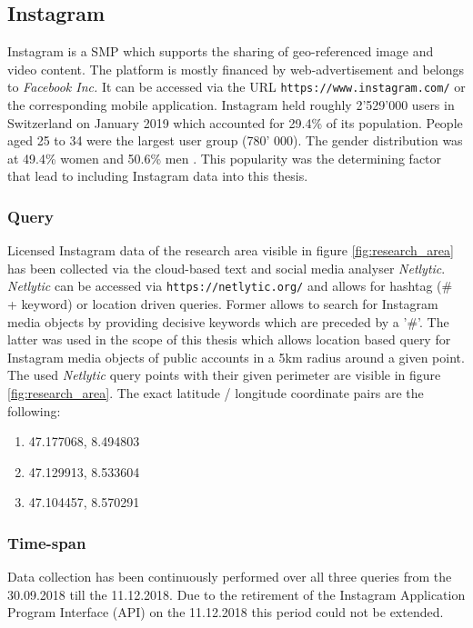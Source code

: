 \subsection{Instagram} \label{instagram}
Instagram is a SMP which supports the sharing of geo-referenced image and video content. The platform is mostly financed by web-advertisement and belongs to \textit{Facebook Inc.} It can be accessed via the URL \texttt{https://www.instagram.com/} or the corresponding mobile application.
Instagram held roughly 2'529'000 users in Switzerland on January 2019 which accounted for 29.4\% of its population. People aged 25 to 34 were the largest user group (780' 000). The gender distribution was at 49.4\% women and 50.6\% men \cite{NapoleonCat2019NoTitle}. This popularity was the determining factor that lead to including Instagram data into this thesis.\\

\subsubsection{Query} \label{netlytic}
Licensed Instagram data of the research area visible in figure \ref{fig:research_area} has been collected via the cloud-based text and social media analyser \textit{Netlytic}. \textit{Netlytic} can be accessed via \texttt{https://netlytic.org/} and allows for hashtag (\# + keyword) or location driven queries. Former allows to search for Instagram media objects by providing decisive keywords which are preceded by a '\#'. The latter was used in the scope of this thesis which allows location based query for Instagram media objects of public accounts in a 5km radius around a given point. The used \textit{Netlytic} query points with their given perimeter are visible in figure \ref{fig:research_area}. The exact latitude / longitude coordinate pairs are the following:\\
\begin{enumerate}
  \item 47.177068, 8.494803
  \item 47.129913, 8.533604
  \item 47.104457, 8.570291
\end{enumerate}

\subsubsection{Time-span} \label{Instagram_timespan}
Data collection has been continuously performed over all three queries from the 30.09.2018 till the 11.12.2018. Due to the retirement of the Instagram Application Program Interface (API) on the 11.12.2018 \cite{Instagram2018InstagramRetirement} this period could not be extended.

